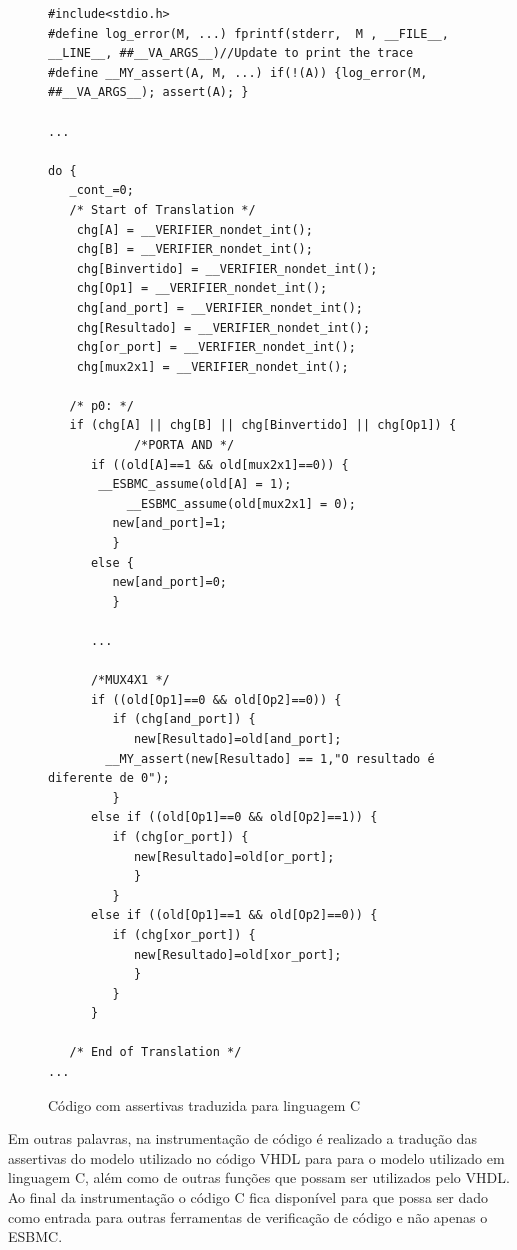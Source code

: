 \begin{figure}[H]
\caption{\label{fig:assert_c} Código com assertivas traduzida para linguagem C}
	\begin{center}
    \begin{minipage}{0.99\textwidth}
    \begin{lstlisting}       
#include<stdio.h>
#define log_error(M, ...) fprintf(stderr,  M , __FILE__, __LINE__, ##__VA_ARGS__)//Update to print the trace
#define __MY_assert(A, M, ...) if(!(A)) {log_error(M, ##__VA_ARGS__); assert(A); }

...

do {
   _cont_=0;
   /* Start of Translation */
    chg[A] = __VERIFIER_nondet_int(); 
    chg[B] = __VERIFIER_nondet_int(); 
    chg[Binvertido] = __VERIFIER_nondet_int(); 
    chg[Op1] = __VERIFIER_nondet_int();
    chg[and_port] = __VERIFIER_nondet_int();
    chg[Resultado] = __VERIFIER_nondet_int();
    chg[or_port] = __VERIFIER_nondet_int();
    chg[mux2x1] = __VERIFIER_nondet_int();

   /* p0: */
   if (chg[A] || chg[B] || chg[Binvertido] || chg[Op1]) {
            /*PORTA AND */
      if ((old[A]==1 && old[mux2x1]==0)) {
	   __ESBMC_assume(old[A] = 1);
           __ESBMC_assume(old[mux2x1] = 0);
         new[and_port]=1;
         }
      else {
         new[and_port]=0;
         }

      ...

      /*MUX4X1 */
      if ((old[Op1]==0 && old[Op2]==0)) {
         if (chg[and_port]) {
            new[Resultado]=old[and_port];
	    __MY_assert(new[Resultado] == 1,"O resultado é diferente de 0");
         }
      else if ((old[Op1]==0 && old[Op2]==1)) {
         if (chg[or_port]) {
            new[Resultado]=old[or_port];
            }
         }
      else if ((old[Op1]==1 && old[Op2]==0)) {
         if (chg[xor_port]) {
            new[Resultado]=old[xor_port];
            }
         }
      }

   /* End of Translation */
...
    \end{lstlisting}
    \end{minipage}
	\end{center}
\end{figure}

\par
Em outras palavras, na instrumentação de código é realizado a tradução das assertivas do modelo utilizado no código VHDL para para o modelo utilizado em linguagem C, além como de outras funções que possam ser utilizados pelo VHDL. Ao final da instrumentação o código C fica disponível para que possa ser dado como entrada para outras ferramentas de verificação de código e não apenas o ESBMC.

